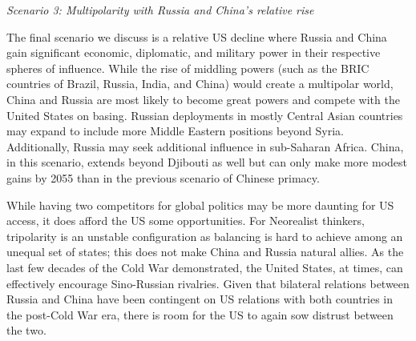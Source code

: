 \textit{Scenario 3: Multipolarity with Russia and China's relative rise}

The final scenario we discuss is a relative US decline where Russia and China gain significant economic, diplomatic, and military power in their respective spheres of influence. While the rise of middling powers (such as the BRIC countries of Brazil, Russia, India, and China) would create a multipolar world, China and Russia are most likely to become great powers and compete with the United States on basing.\cite{cooper2013,Mattis2018,Cooley2020} Russian deployments in mostly Central Asian countries may expand to include more Middle Eastern positions beyond Syria. Additionally, Russia may seek additional influence in sub-Saharan Africa. China, in this scenario, extends beyond Djibouti as well but can only make more modest gains by 2055 than in the previous scenario of Chinese primacy. 


While having two competitors for global politics may be more daunting for US access, it does afford the US some opportunities. For Neorealist thinkers, tripolarity is an unstable configuration as balancing is hard to achieve among an unequal set of states; this does not make China and Russia natural allies.\cite{Waltz1979} As the last few decades of the Cold War demonstrated, the United States, at times, can effectively encourage Sino-Russian rivalries.\cite{goh2005} Given that bilateral relations between Russia and China have been contingent on US relations with both countries in the post-Cold War era, there is room for the US to again sow distrust between the two.\cite{ferdinand2007} 

